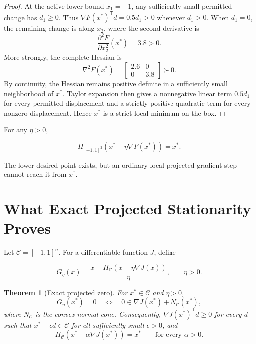 \documentclass[11pt]{article}
\newtheorem{theorem}{Theorem}
\theoremstyle{remark}
\newcommand{\Cbox}{\mathcal{C}}
\newcommand{\proj}[2]{\Pi_{#1}\!\left(#2\right)}
\newcommand{\trans}{\mathsf{T}}
\begin{document}
\begin{proof}
At the active lower bound $x_1=-1$, any sufficiently small permitted change
has $d_1\ge0$.  Thus $\nabla F(x^*)^{\trans}d=0.5d_1>0$ whenever $d_1>0$.
When $d_1=0$, the remaining change is along $x_2$, where the second derivative
is
\begin{equation}
\frac{\partial^2 F}{\partial x_2^2}(x^*)=3.8>0.
\end{equation}
More strongly, the complete Hessian is
\begin{equation}
\nabla^2F(x^*)=
\begin{bmatrix}
2.6&0\\
0&3.8
\end{bmatrix}
\succ0.
\end{equation}
By continuity, the Hessian remains positive definite in a sufficiently small
neighborhood of $x^*$.  Taylor expansion then gives a nonnegative linear term
$0.5d_1$ for every permitted displacement and a strictly positive quadratic
term for every nonzero displacement.  Hence $x^*$ is a strict local minimum
on the box.
\end{proof}

For any $\eta>0$,

\begin{equation}
\proj{[-1,1]^2}{x^*-\eta\nabla F(x^*)}=x^*.
\end{equation}

The lower desired point exists, but an ordinary local projected-gradient step
cannot reach it from $x^*$.

\section{What Exact Projected Stationarity Proves}

Let $\Cbox=[-1,1]^n$.  For a differentiable function $J$, define

\begin{equation}
G_\eta(x)=
\frac{x-\proj{\Cbox}{x-\eta\nabla J(x)}}{\eta},
\qquad \eta>0.
\label{eq:gradient-residual}
\end{equation}

\begin{theorem}[Exact projected zero]
For $x^*\in\Cbox$ and $\eta>0$,
\begin{equation}
G_\eta(x^*)=0
\quad\Longleftrightarrow\quad
0\in\nabla J(x^*)+N_{\Cbox}(x^*),
\label{eq:kkt}
\end{equation}
where $N_{\Cbox}$ is the convex normal cone.  Consequently,
$\nabla J(x^*)^{\trans}d\ge0$ for every $d$ such that
$x^*+\epsilon d\in\Cbox$ for all sufficiently small $\epsilon>0$, and
\begin{equation}
\proj{\Cbox}{x^*-\alpha\nabla J(x^*)}=x^*
\qquad\text{for every }\alpha>0.
\end{equation}
\end{theorem}
\end{document}
